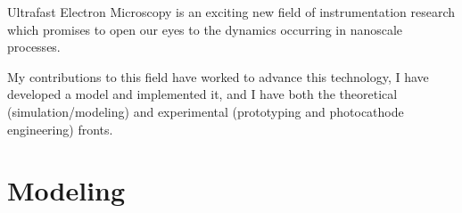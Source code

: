 
Ultrafast Electron Microscopy is an exciting new field of instrumentation research which promises to open our eyes to the dynamics occurring in nanoscale processes.

My contributions to this field have worked to advance this technology, I have developed a model and implemented it, and I have  both the theoretical (simulation/modeling) and experimental (prototyping and photocathode engineering) fronts.

\section{Modeling}

